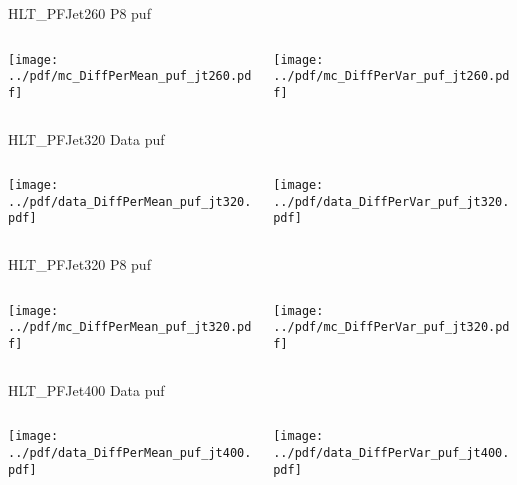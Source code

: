 \documentclass[9pt]{beamer}
\begin{document}
\begin{frame}[t]{HLT\_PFJet260 P8 puf}
\begin{columns}[T]
  \begin{column}{.5\textwidth}
  \texttt{[image: ../pdf/mc\_DiffPerMean\_puf\_jt260.pdf]}
  \end{column}
  \begin{column}{.5\textwidth}
  \texttt{[image: ../pdf/mc\_DiffPerVar\_puf\_jt260.pdf]}
  \end{column}
\end{columns}
\end{frame}

\begin{frame}[t]{HLT\_PFJet320 Data puf}
\begin{columns}[T]
  \begin{column}{.5\textwidth}
  \texttt{[image: ../pdf/data\_DiffPerMean\_puf\_jt320.pdf]}
  \end{column}
  \begin{column}{.5\textwidth}
  \texttt{[image: ../pdf/data\_DiffPerVar\_puf\_jt320.pdf]}
  \end{column}
\end{columns}
\end{frame}

\begin{frame}[t]{HLT\_PFJet320 P8 puf}
\begin{columns}[T]
  \begin{column}{.5\textwidth}
  \texttt{[image: ../pdf/mc\_DiffPerMean\_puf\_jt320.pdf]}
  \end{column}
  \begin{column}{.5\textwidth}
  \texttt{[image: ../pdf/mc\_DiffPerVar\_puf\_jt320.pdf]}
  \end{column}
\end{columns}
\end{frame}

\begin{frame}[t]{HLT\_PFJet400 Data puf}
\begin{columns}[T]
  \begin{column}{.5\textwidth}
  \texttt{[image: ../pdf/data\_DiffPerMean\_puf\_jt400.pdf]}
  \end{column}
  \begin{column}{.5\textwidth}
  \texttt{[image: ../pdf/data\_DiffPerVar\_puf\_jt400.pdf]}
  \end{column}
\end{columns}
\end{frame}
\end{document}
